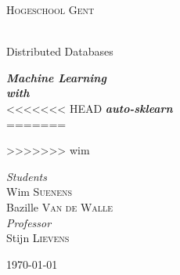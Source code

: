 \documentclass[12pt]{DistributedDatabases}[2021/12/09]
\begin{document}
\frontmatter %

\begin{titlepage}
\begin{center}

\vspace*{.06\textheight}
{\scshape\LARGE{Hogeschool Gent}}
\vspace{1.5cm}

\HRule \\[0.8cm] %
{\huge{Distributed Databases}}\vspace{0.4cm}
\HRule \\[1.5cm] %

\vfill

\large \textit{\textbf{Machine Learning}}\\[0.4cm]
\textit{\textbf{with}}\\[0.4cm]
<<<<<<< HEAD
\textit{\textbf{auto-sklearn}}\\[0.4cm]

=======
  
>>>>>>> wim
\vfill

\begin{flushright} \large
  \emph{Students}\\
  Wim \textsc{Suenens} \\
  Bazille \textsc{Van de Walle} \\
  \vspace{1.0cm}
  \emph{Professor}\\
  Stijn \textsc{Lievens}
\end{flushright}

\vfill

{\large \today}\\[2cm]

\vfill
\end{center}
\end{titlepage}

\tableofcontents

\mainmatter %
\setcounter{page}{1}




\end{document}
